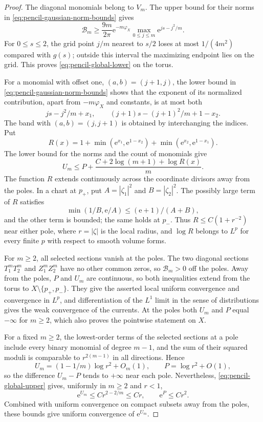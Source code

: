 \begin{proof}
The diagonal monomials belong to $V_m$. The upper bound for their norms in \eqref{eq:pencil-gaussian-norm-bounds} gives
\[
 \mathcal B_m\geq\frac{9m}{2\pi}\mathrm e^{-m\varphi_X}
                     \max_{0\leq j\leq m}\mathrm e^{js-j^2/m}.
\]
For $0\leq s\leq2$, the grid point $j/m$ nearest to $s/2$ loses at most $1/(4m^2)$ compared with $g(s)$; outside this interval the maximizing endpoint lies on the grid. This proves \eqref{eq:pencil-global-lower} on the torus.

For a monomial with offset one, $(a,b)=(j+1,j)$, the lower bound in \eqref{eq:pencil-gaussian-norm-bounds} shows that the exponent of its normalized contribution, apart from $-m\varphi_X$ and constants, is at most both
\[
 js-j^2/m+x_1,\qquad
 (j+1)s-(j+1)^2/m+1-x_2.
\]
The band with $(a,b)=(j,j+1)$ is obtained by interchanging the indices. Put
\[
 R(x)=1+\min(\mathrm e^{x_1},\mathrm e^{1-x_2})
           +\min(\mathrm e^{x_2},\mathrm e^{1-x_1}).
\]
The lower bound for the norms and the count of monomials give
\begin{equation}\label{eq:pencil-global-upper}
 U_m\leq P+\frac{C+2\log(m+1)+\log R(x)}m.
\end{equation}
The function $R$ extends continuously across the coordinate divisors away from the poles. In a chart at $p_+$, put $A=|\zeta_1|^2$ and $B=|\zeta_2|^2$. The possibly large term of $R$ satisfies
\[
 \min(1/B,\mathrm e/A)\leq(\mathrm e+1)/(A+B),
\]
and the other term is bounded; the same holds at $p_-$. Thus $R\leq C(1+r^{-2})$ near either pole, where $r=|\zeta|$ is the local radius, and $\log R$ belongs to $L^p$ for every finite $p$ with respect to smooth volume forms.

For $m\geq2$, all selected sections vanish at the poles. The two diagonal sections $T_1^mT_2^m$ and $Z_1^mZ_2^m$ have no other common zeros, so $\mathcal B_m>0$ off the poles. Away from the poles, $P$ and $U_m$ are continuous, so both inequalities extend from the torus to $X\setminus\{p_+,p_-\}$. They give the asserted local uniform convergence and convergence in $L^p$, and differentiation of the $L^1$ limit in the sense of distributions gives the weak convergence of the currents. At the poles both $U_m$ and $P$ equal $-\infty$ for $m\geq2$, which also proves the pointwise statement on $X$.

For a fixed $m\geq2$, the lowest-order terms of the selected sections at a pole include every binary monomial of degree $m-1$, and the sum of their squared moduli is comparable to $r^{2(m-1)}$ in all directions. Hence
\[
 U_m=(1-1/m)\log r^2+O_m(1),\qquad P=\log r^2+O(1),
\]
so the difference $U_m-P$ tends to $+\infty$ near each pole. Nevertheless, \eqref{eq:pencil-global-upper} gives, uniformly in $m\geq2$ and $r<1$,
\[
 \mathrm e^{U_m}\leq Cr^{2-2/m}\leq Cr,\qquad \mathrm e^P\leq Cr^2.
\]
Combined with uniform convergence on compact subsets away from the poles, these bounds give uniform convergence of $\mathrm e^{U_m}$.


\end{proof}
